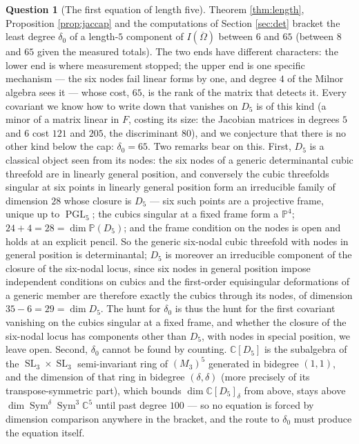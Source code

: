 \documentclass[11pt,reqno]{amsart}
\theoremstyle{plain}
\theoremstyle{definition}
\newtheorem{question}[theorem]{Question}
\DeclareMathOperator{\SL}{SL}
\DeclareMathOperator{\PGL}{PGL}
\DeclareMathOperator{\Sym}{Sym}
\newcommand{\cO}{\overline{\Omega}}
\newcommand{\bC}{\mathbb{C}}
\begin{document}
\begin{question}[The first equation of length five]\label{q:delta0}
Theorem \ref{thm:length}, Proposition \ref{prop:jaccap} and the computations
of Section \ref{sec:det} bracket the least degree $\delta_0$ of a length-$5$
component of $I(\cO)$ between $6$ and $65$ (between $8$ and $65$ given the
measured totals).  The two ends have different characters: the lower end is
where measurement stopped; the upper end is one specific mechanism --- the six
nodes fail linear forms by one, and degree $4$ of the Milnor algebra sees it
--- whose cost, $65$, is the rank of the matrix that detects it.  Every
covariant we know how to write down that vanishes on $D_5$ is of this kind (a
minor of a matrix linear in $F$, costing its size: the Jacobian matrices in
degrees $5$ and $6$ cost $121$ and $205$, the discriminant $80$), and we
conjecture that there is no other kind below the cap: $\delta_0=65$.  Two
remarks bear on this.  First, $D_5$ is a classical object seen from its nodes:
the six nodes of a generic determinantal cubic threefold are in linearly
general position, and conversely the cubic threefolds singular at six points
in linearly general position form an irreducible family of dimension $28$
whose closure is $D_5$ --- six such points are a projective frame, unique up
to $\PGL_5$; the cubics singular at a fixed frame form a $\mathbb{P}^{4}$;
$24+4=28=\dim\mathbb{P}(D_5)$; and the frame condition on the nodes is open and
holds at an explicit pencil.  So the generic six-nodal cubic threefold with
nodes in general position is determinantal; $D_5$ is moreover an irreducible
component of the closure of the six-nodal locus, since six nodes in general
position impose independent conditions on cubics and the first-order
equisingular deformations of a generic member are therefore exactly the cubics
through its nodes, of dimension $35-6=29=\dim D_5$.  The hunt for $\delta_0$ is
thus the hunt for the first covariant vanishing on the cubics singular at a
fixed frame, and whether the closure of the six-nodal locus has components
other than $D_5$, with nodes in special position, we leave open.  Second,
$\delta_0$ cannot be found by counting.  $\bC[D_5]$ is the subalgebra of the
$\SL_3\times\SL_3$ semi-invariant ring of $(M_3)^{5}$ generated in bidegree
$(1,1)$, and the dimension of that ring in bidegree $(\delta,\delta)$ (more
precisely of its transpose-symmetric part), which bounds $\dim\bC[D_5]_\delta$
from above, stays above $\dim\Sym^{\delta}\Sym^{3}\bC^{5}$ until past degree
$100$ --- so no equation is forced by dimension comparison anywhere in the
bracket, and the route to $\delta_0$ must produce the equation itself.
\end{question}
\end{document}

